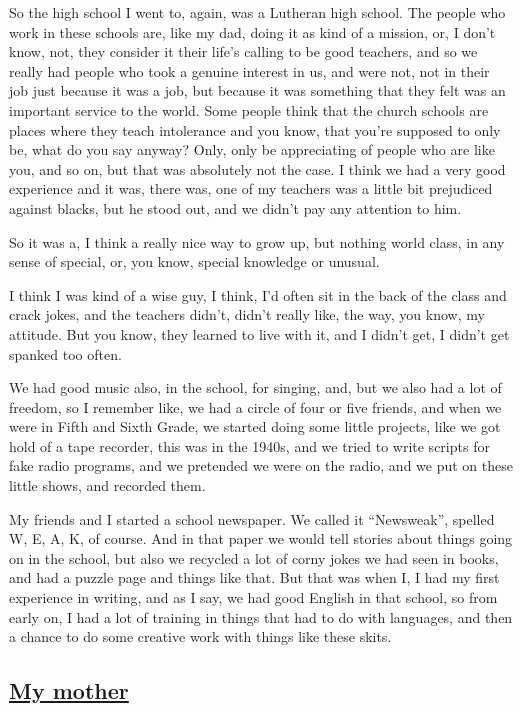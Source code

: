 \documentclass[]{article}
\begin{document}
So the high school I went to, again, was a Lutheran high school. The
people who work in these schools are, like my dad, doing it as kind of a
mission, or, I don't know, not, they consider it their life's calling to
be good teachers, and so we really had people who took a genuine
interest in us, and were not, not in their job just because it was a
job, but because it was something that they felt was an important
service to the world. Some people think that the church schools are
places where they teach intolerance and you know, that you're supposed
to only be, what do you say anyway? Only, only be appreciating of people
who are like you, and so on, but that was absolutely not the case. I
think we had a very good experience and it was, there was, one of my
teachers was a little bit prejudiced against blacks, but he stood out,
and we didn't pay any attention to him.

So it was a, I think a really nice way to grow up, but nothing world
class, in any sense of special, or, you know, special knowledge or
unusual.

I think I was kind of a wise guy, I think, I'd often sit in the back of
the class and crack jokes, and the teachers didn't, didn't really like,
the way, you know, my attitude. But you know, they learned to live with
it, and I didn't get, I didn't get spanked too often.

We had good music also, in the school, for singing, and, but we also had
a lot of freedom, so I remember like, we had a circle of four or five
friends, and when we were in Fifth and Sixth Grade, we started doing
some little projects, like we got hold of a tape recorder, this was in
the 1940s, and we tried to write scripts for fake radio programs, and we
pretended we were on the radio, and we put on these little shows, and
recorded them.

My friends and I started a school newspaper. We called it ``Newsweak'',
spelled W, E, A, K, of course. And in that paper we would tell stories
about things going on in the school, but also we recycled a lot of corny
jokes we had seen in books, and had a puzzle page and things like that.
But that was when I, I had my first experience in writing, and as I say,
we had good English in that school, so from early on, I had a lot of
training in things that had to do with languages, and then a chance to
do some creative work with things like these skits.

\subsection{\texorpdfstring{\href{http://webofstories.com/play/17062}{My
mother}}{My mother}}\label{my-mother}
\end{document}
